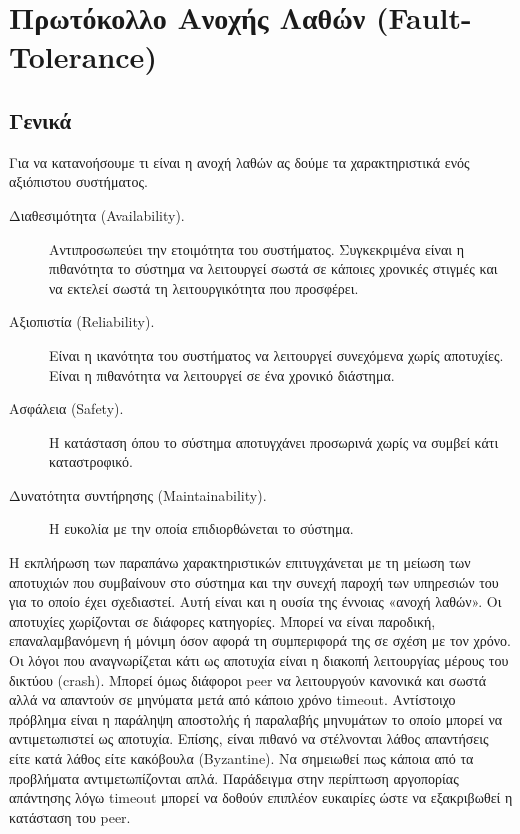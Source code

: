 \section{Πρωτόκολλο Ανοχής Λαθών (Fault-Tolerance)}
\label{sec:Fault}

\subsection{Γενικά}

Για να κατανοήσουμε τι είναι η ανοχή λαθών ας δούμε τα χαρακτηριστικά 
ενός αξιόπιστου συστήματος. 

\begin{description}
\item [Διαθεσιμότητα (Availability).] Αντιπροσωπεύει την ετοιμότητα του 
συστήματος. Συγκεκριμένα είναι η πιθανότητα το σύστημα να λειτουργεί 
σωστά σε κάποιες χρονικές στιγμές και να εκτελεί σωστά τη 
λειτουργικότητα που προσφέρει.
\item [Αξιοπιστία (Reliability).] Είναι η ικανότητα του συστήματος να 
λειτουργεί συνεχόμενα χωρίς αποτυχίες. Είναι η πιθανότητα να λειτουργεί 
σε ένα χρονικό διάστημα.
\item [Ασφάλεια (Safety).] Η κατάσταση όπου το σύστημα αποτυγχάνει 
προσωρινά χωρίς να συμβεί κάτι καταστροφικό.
\item [Δυνατότητα συντήρησης (Maintainability).] Η ευκολία με την οποία 
επιδιορθώνεται το σύστημα.
\end{description}

Η εκπλήρωση των παραπάνω χαρακτηριστικών επιτυγχάνεται με τη μείωση των 
αποτυχιών που συμβαίνουν στο σύστημα και την συνεχή παροχή των υπηρεσιών 
του για το οποίο έχει σχεδιαστεί. Αυτή είναι και η ουσία της έννοιας 
«ανοχή λαθών». Οι αποτυχίες χωρίζονται σε διάφορες κατηγορίες. Μπορεί να 
είναι παροδική, επαναλαμβανόμενη ή μόνιμη όσον αφορά τη συμπεριφορά της 
σε σχέση με τον χρόνο. Οι λόγοι που αναγνωρίζεται κάτι ως αποτυχία είναι 
η διακοπή λειτουργίας μέρους του δικτύου (crash). Μπορεί όμως διάφοροι 
peer να λειτουργούν κανονικά και σωστά αλλά να απαντούν σε μηνύματα μετά 
από κάποιο χρόνο timeout. Αντίστοιχο πρόβλημα είναι η παράληψη αποστολής 
ή παραλαβής μηνυμάτων το οποίο μπορεί να αντιμετωπιστεί ως αποτυχία. 
Επίσης, είναι πιθανό να στέλνονται λάθος απαντήσεις είτε κατά λάθος είτε 
κακόβουλα (Byzantine). Να σημειωθεί πως κάποια από τα προβλήματα 
αντιμετωπίζονται απλά. Παράδειγμα στην περίπτωση αργοπορίας απάντησης 
λόγω timeout μπορεί να δοθούν επιπλέον ευκαιρίες ώστε να εξακριβωθεί η 
κατάσταση του peer.

